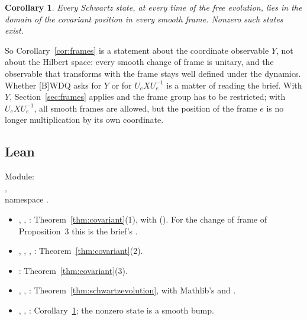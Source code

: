 \documentclass[11pt]{article}
\newtheorem{corollary}[theorem]{Corollary}
\theoremstyle{remark}
\begin{document}
\begin{corollary}\label{cor:covariant}
  Every Schwartz state, at every time of the free evolution, lies in the domain of the covariant
  position in every smooth frame. Nonzero such states exist.
\end{corollary}

So Corollary~\ref{cor:frames} is a statement about the coordinate observable $Y$, not about the
Hilbert space: every smooth change of frame is unitary, and the observable that transforms with
the frame stays well defined under the dynamics. Whether [B]WDQ asks for $Y$ or for
$U_e X U_e^{-1}$ is a matter of reading the brief. With $Y$, Section~\ref{sec:frames} applies and
the frame group has to be restricted; with $U_e X U_e^{-1}$, all smooth frames are allowed, but
the position of the frame $e$ is no longer multiplication by its own coordinate.

\subsection{Lean}

Module:\\ ,\\ namespace
.
\begin{itemize}
  \item {}, ,
    : Theorem~\ref{thm:covariant}(1), with
     ().
    For the change of frame of Proposition~3 this is the brief's
    .
  \item {}, ,
    , :
    Theorem~\ref{thm:covariant}(2).
  \item {}: Theorem~\ref{thm:covariant}(3).
  \item {}, ,
    : Theorem~\ref{thm:schwartzevolution}, with
    Mathlib's  and .
  \item {}, ,
    : Corollary~\ref{cor:covariant}; the nonzero state
    is a smooth bump.
\end{itemize}
\end{document}
